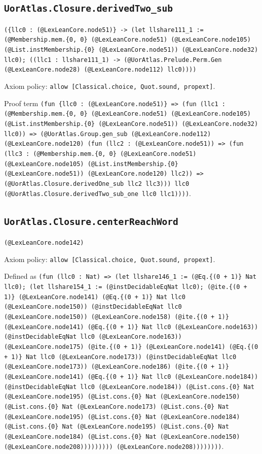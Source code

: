\documentclass[11pt]{article}
\begin{document}
\subsection*{\texttt{UorAtlas.Closure.derivedTwo\_sub}}
\noindent\texttt{(\{llc0 : (@LexLeanCore.node51)\} -> (let llshare111\_1 := (@Membership.mem.\{0, 0\} (@LexLeanCore.node51) (@LexLeanCore.node105) (@List.instMembership.\{0\} (@LexLeanCore.node51)) (@LexLeanCore.node32) llc0); ((llc1 : llshare111\_1) -> (@UorAtlas.Prelude.Perm.Gen (@LexLeanCore.node28) (@LexLeanCore.node112) llc0))))}\par
\noindent Axiom policy: \texttt{allow [Classical.choice, Quot.sound, propext]}.\par
\noindent Proof term \texttt{(fun \{llc0 : (@LexLeanCore.node51)\} => (fun (llc1 : (@Membership.mem.\{0, 0\} (@LexLeanCore.node51) (@LexLeanCore.node105) (@List.instMembership.\{0\} (@LexLeanCore.node51)) (@LexLeanCore.node32) llc0)) => (@UorAtlas.Group.gen\_sub (@LexLeanCore.node112) (@LexLeanCore.node120) (fun (llc2 : (@LexLeanCore.node51)) => (fun (llc3 : (@Membership.mem.\{0, 0\} (@LexLeanCore.node51) (@LexLeanCore.node105) (@List.instMembership.\{0\} (@LexLeanCore.node51)) (@LexLeanCore.node120) llc2)) => (@UorAtlas.Closure.derivedOne\_sub llc2 llc3))) llc0 (@UorAtlas.Closure.derivedTwo\_sub\_one llc0 llc1))))}.\par
\subsection*{\texttt{UorAtlas.Closure.centerReachWord}}
\noindent\texttt{(@LexLeanCore.node142)}\par
\noindent Axiom policy: \texttt{allow [Classical.choice, Quot.sound, propext]}.\par
\noindent Defined as \texttt{(fun (llc0 : Nat) => (let llshare146\_1 := (@Eq.\{(0 + 1)\} Nat llc0); (let llshare154\_1 := (@instDecidableEqNat llc0); (@ite.\{(0 + 1)\} (@LexLeanCore.node141) (@Eq.\{(0 + 1)\} Nat llc0 (@LexLeanCore.node150)) (@instDecidableEqNat llc0 (@LexLeanCore.node150)) (@LexLeanCore.node158) (@ite.\{(0 + 1)\} (@LexLeanCore.node141) (@Eq.\{(0 + 1)\} Nat llc0 (@LexLeanCore.node163)) (@instDecidableEqNat llc0 (@LexLeanCore.node163)) (@LexLeanCore.node175) (@ite.\{(0 + 1)\} (@LexLeanCore.node141) (@Eq.\{(0 + 1)\} Nat llc0 (@LexLeanCore.node173)) (@instDecidableEqNat llc0 (@LexLeanCore.node173)) (@LexLeanCore.node186) (@ite.\{(0 + 1)\} (@LexLeanCore.node141) (@Eq.\{(0 + 1)\} Nat llc0 (@LexLeanCore.node184)) (@instDecidableEqNat llc0 (@LexLeanCore.node184)) (@List.cons.\{0\} Nat (@LexLeanCore.node195) (@List.cons.\{0\} Nat (@LexLeanCore.node150) (@List.cons.\{0\} Nat (@LexLeanCore.node173) (@List.cons.\{0\} Nat (@LexLeanCore.node195) (@List.cons.\{0\} Nat (@LexLeanCore.node184) (@List.cons.\{0\} Nat (@LexLeanCore.node195) (@List.cons.\{0\} Nat (@LexLeanCore.node184) (@List.cons.\{0\} Nat (@LexLeanCore.node150) (@LexLeanCore.node208))))))))) (@LexLeanCore.node208))))))))}.\par
\end{document}
